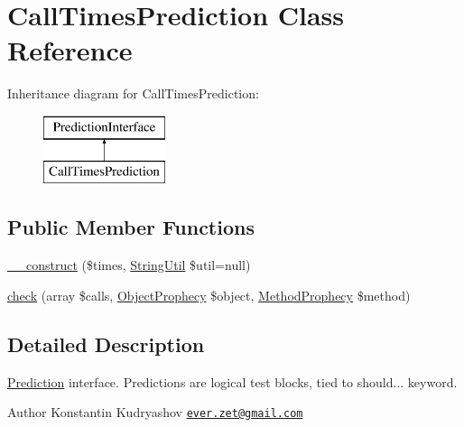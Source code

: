 \hypertarget{class_prophecy_1_1_prediction_1_1_call_times_prediction}{}\section{Call\+Times\+Prediction Class Reference}
\label{class_prophecy_1_1_prediction_1_1_call_times_prediction}
Inheritance diagram for Call\+Times\+Prediction\+:\begin{figure}[H]
\begin{center}
\leavevmode
\includegraphics[height=2.000000cm]{class_prophecy_1_1_prediction_1_1_call_times_prediction}
\end{center}
\end{figure}
\subsection*{Public Member Functions}
\begin{DoxyCompactItemize}
\item 
\mbox{\hyperlink{class_prophecy_1_1_prediction_1_1_call_times_prediction_a1aa2624feb0b8076eff5407347bee09d}{\+\_\+\+\_\+construct}} (\$times, \mbox{\hyperlink{class_prophecy_1_1_util_1_1_string_util}{String\+Util}} \$util=null)
\item 
\mbox{\hyperlink{class_prophecy_1_1_prediction_1_1_call_times_prediction_a8753cea9fc952add136830abab587633}{check}} (array \$calls, \mbox{\hyperlink{class_prophecy_1_1_prophecy_1_1_object_prophecy}{Object\+Prophecy}} \$object, \mbox{\hyperlink{class_prophecy_1_1_prophecy_1_1_method_prophecy}{Method\+Prophecy}} \$method)
\end{DoxyCompactItemize}


\subsection{Detailed Description}
\mbox{\hyperlink{namespace_prophecy_1_1_prediction}{Prediction}} interface. Predictions are logical test blocks, tied to {\ttfamily should...} keyword.

\begin{DoxyAuthor}{Author}
Konstantin Kudryashov \href{mailto:ever.zet@gmail.com}{\tt ever.\+zet@gmail.\+com} 
\end{DoxyAuthor}



